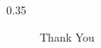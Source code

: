 \STANDARD{}
{
  \begin{columns}
    \begin{column}{0.35\textwidth}
      \begin{block}{~~~~~~Thank You}
        \centering

      \end{block}
    \end{column}
  \end{columns}
}



